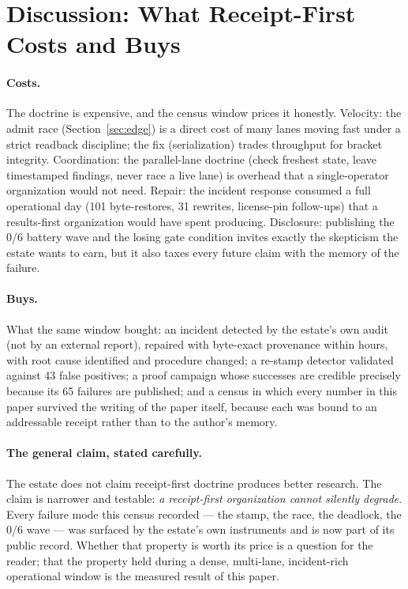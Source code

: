 ﻿\documentclass[11pt]{article}
\begin{document}
\section{Discussion: What Receipt-First Costs and Buys}
\label{sec:discussion}

\paragraph{Costs.} The doctrine is expensive, and the census window prices it honestly. Velocity: the admit race (Section~\ref{sec:edge}) is a direct cost of many lanes moving fast under a strict readback discipline; the fix (serialization) trades throughput for bracket integrity. Coordination: the parallel-lane doctrine (check freshest state, leave timestamped findings, never race a live lane) is overhead that a single-operator organization would not need. Repair: the incident response consumed a full operational day (101 byte-restores, 31 rewrites, license-pin follow-ups) that a results-first organization would have spent producing. Disclosure: publishing the 0/6 battery wave and the losing gate condition invites exactly the skepticism the estate wants to earn, but it also taxes every future claim with the memory of the failure.

\paragraph{Buys.} What the same window bought: an incident detected by the estate's own audit (not by an external report), repaired with byte-exact provenance within hours, with root cause identified and procedure changed; a re-stamp detector validated against 43 false positives; a proof campaign whose successes are credible precisely because its 65 failures are published; and a census in which every number in this paper survived the writing of the paper itself, because each was bound to an addressable receipt rather than to the author's memory.

\paragraph{The general claim, stated carefully.} The estate does not claim receipt-first doctrine produces better research. The claim is narrower and testable: \emph{a receipt-first organization cannot silently degrade}. Every failure mode this census recorded --- the stamp, the race, the deadlock, the 0/6 wave --- was surfaced by the estate's own instruments and is now part of its public record. Whether that property is worth its price is a question for the reader; that the property held during a dense, multi-lane, incident-rich operational window is the measured result of this paper.
\end{document}
